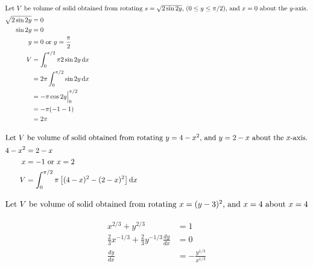 \documentclass[12pt]{article}
\newcommand*\diff{\mathop{}\!\mathrm{d}}
\newenvironment{problem}[2][Problem]{\begin{trivlist}
\item[\hskip \labelsep {\bfseries #1}\hskip \labelsep {\bfseries #2.}]}{\end{trivlist}}
\begin{document}
\begin{problem}{3.b}
\end{problem}
\begin{align*}
\intertext{Let $V$ be volume of solid obtained from rotating $s = \sqrt{2\sin 2y}$, $(0 \le y \le \pi/2)$, and $x=0$ about the $y$-axis.}
\sqrt{2\sin 2y} &= 0\\
\sin 2y &= 0\\
y &= 0 \text{ or } y = \frac{\pi}{2}\\
V &= \int_{0}^{\pi/2} \pi 2\sin 2y \diff x\\
&= 2\pi \int_{0}^{\pi/2} \sin 2y \diff x\\
&= -\pi \cos 2y \Bigl|_{0}^{\pi/2}\\
&= -\pi (-1 - 1)\\
&= 2\pi \\
\end{align*}
\filbreak

\begin{problem}{3.c}
\end{problem}
\begin{align*}
\intertext{Let $V$ be volume of solid obtained from rotating $y = 4-x^2$, and $y = 2- x$ about the $x$-axis.}
4-x^2 &= 2 - x\\
x &= - 1 \text{ or } x = 2 \\
V &= \int_{0}^{\pi/2} \pi \left[ (4-x)^2 - (2 - x)^2 \right] \diff x\\
\end{align*}
\filbreak

\begin{problem}{3.f}
\end{problem}
\begin{align*}
\intertext{Let $V$ be volume of solid obtained from rotating $x= (y-3) ^2 $, and $x= 4$ about $x = 4$}
\end{align*}
\filbreak

\begin{problem}{4.c}
\end{problem}
\begin{align*}
x ^ {2/3} + y^ {2/3}  &= 1\\
\frac{2}{3}x^{-1/3} + \frac{2}{3} y^{-1/3}  \frac{dy}{dx}  &= 0\\
\frac{dy}{dx} &= -\frac{y^{1/3}}{x^{1/3}} \\
\end{align*}
\filbreak
\end{document}
